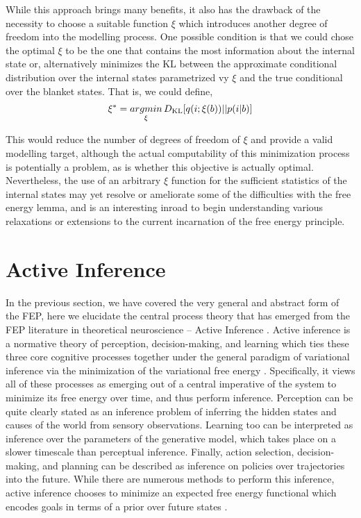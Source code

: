 While this approach brings many benefits, it also has the drawback of the necessity to choose a suitable function $\xi$ which introduces another degree of freedom into the modelling process. One possible condition is that we could chose the optimal $\xi$ to be the one that contains the most information about the internal state or, alternatively minimizes the KL between the approximate conditional distribution over the internal states parametrized vy $\xi$ and the true conditional over the blanket states. That is, we could define,
\begin{align*}
    \xi^* = \underset{\xi}{argmin} \, D_\mathrm{KL}[q(i; \xi(b)) || p(i | b)]
\end{align*}

This would reduce the number of degrees of freedom of $\xi$ and provide a valid modelling target, although the actual computability of this minimization process is potentially a problem, as is whether this objective is actually optimal. Nevertheless, the use of an arbitrary $\xi$ function for the sufficient statistics of the internal states may yet resolve or ameliorate some of the difficulties with the free energy lemma, and is an interesting inroad to begin understanding various relaxations or extensions to the current incarnation of the free energy principle.

\section{Active Inference}

In the previous section, we have covered the very general and abstract form of the FEP, here we elucidate the central process theory that has emerged from the FEP literature in theoretical neuroscience -- Active Inference \citep{friston2012active,friston2009reinforcement}. Active inference is a normative theory of perception, decision-making, and learning which ties these three core cognitive processes together under the general paradigm of variational inference via the minimization of the variational free energy \citep{friston2015active,friston2017process}. Specifically, it views all of these processes as emerging out of a central imperative of the system to minimize its free energy over time, and thus perform inference. Perception can be quite clearly stated as an inference problem of inferring the hidden states and causes of the world from sensory observations. Learning too can be interpreted as inference over the parameters of the generative model, which takes place on a slower timescale than perceptual inference. Finally, action selection, decision-making, and planning can be described as inference on policies over trajectories into the future. While there are numerous methods to perform this inference, active inference chooses to minimize an expected free energy functional which encodes goals in terms of a prior over future states \citep{da2020active}.


